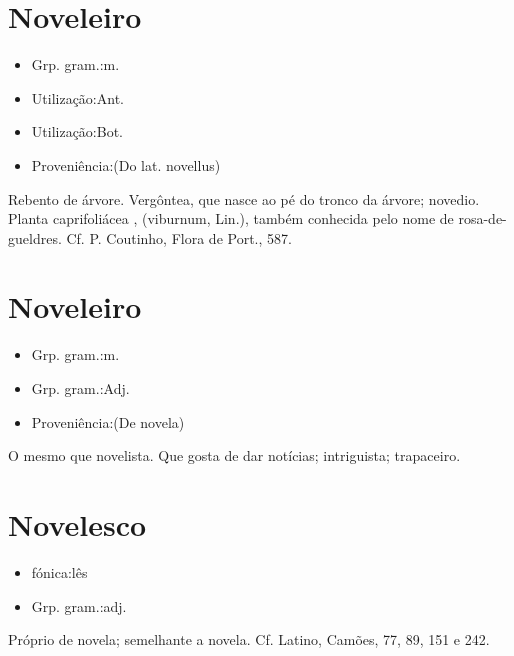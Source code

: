 \section{Noveleiro}
\begin{itemize}
\item {Grp. gram.:m.}
\end{itemize}
\begin{itemize}
\item {Utilização:Ant.}
\end{itemize}
\begin{itemize}
\item {Utilização:Bot.}
\end{itemize}
\begin{itemize}
\item {Proveniência:(Do lat. \textunderscore novellus\textunderscore )}
\end{itemize}
Rebento de árvore.
Vergôntea, que nasce ao pé do tronco da árvore; novedio.
Planta caprifoliácea , (\textunderscore viburnum\textunderscore , Lin.), também conhecida pelo nome de \textunderscore rosa-de-gueldres\textunderscore . Cf. P. Coutinho, \textunderscore Flora de Port.\textunderscore , 587.
\section{Noveleiro}
\begin{itemize}
\item {Grp. gram.:m.}
\end{itemize}
\begin{itemize}
\item {Grp. gram.:Adj.}
\end{itemize}
\begin{itemize}
\item {Proveniência:(De \textunderscore novela\textunderscore )}
\end{itemize}
O mesmo que \textunderscore novelista\textunderscore .
Que gosta de dar notícias; intriguista; trapaceiro.
\section{Novelesco}
\begin{itemize}
\item {fónica:lês}
\end{itemize}
\begin{itemize}
\item {Grp. gram.:adj.}
\end{itemize}
Próprio de novela; semelhante a novela. Cf. Latino, \textunderscore Camões\textunderscore , 77, 89, 151 e 242.
